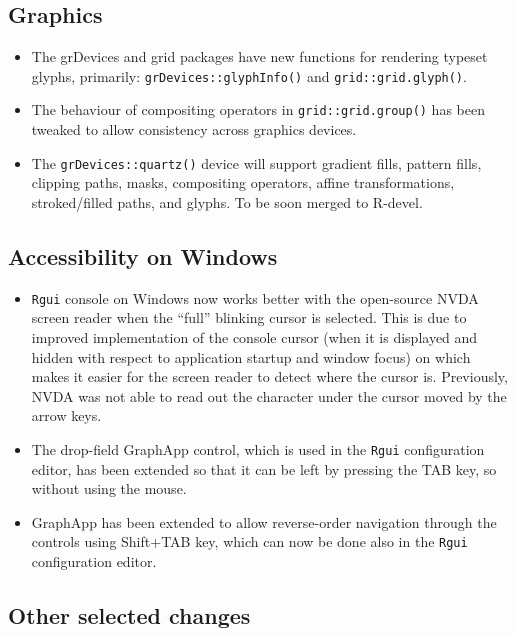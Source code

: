 \hypertarget{graphics}{%
\subsection{Graphics}\label{graphics}}

\begin{itemize}
\item
  The grDevices and grid packages have new functions for rendering typeset
  glyphs, primarily: \texttt{grDevices::glyphInfo()} and \texttt{grid::grid.glyph()}.
\item
  The behaviour of compositing operators in \texttt{grid::grid.group()} has been
  tweaked to allow consistency across graphics devices.
\item
  The \texttt{grDevices::quartz()} device will support gradient fills, pattern
  fills, clipping paths, masks, compositing operators, affine
  transformations, stroked/filled paths, and glyphs. To be soon merged to
  R-devel.
\end{itemize}

\hypertarget{accessibility-on-windows}{%
\subsection{Accessibility on Windows}\label{accessibility-on-windows}}

\begin{itemize}
\item
  \texttt{Rgui} console on Windows now works better with the open-source NVDA
  screen reader when the ``full'' blinking cursor is selected. This is due to
  improved implementation of the console cursor (when it is displayed and
  hidden with respect to application startup and window focus) on which
  makes it easier for the screen reader to detect where the cursor is.
  Previously, NVDA was not able to read out the character under the cursor
  moved by the arrow keys.
\item
  The drop-field GraphApp control, which is used in the \texttt{Rgui} configuration
  editor, has been extended so that it can be left by pressing the TAB key,
  so without using the mouse.
\item
  GraphApp has been extended to allow reverse-order navigation through the
  controls using Shift+TAB key, which can now be done also in the \texttt{Rgui}
  configuration editor.
\end{itemize}

\hypertarget{other-selected-changes}{%
\subsection{Other selected changes}\label{other-selected-changes}}

